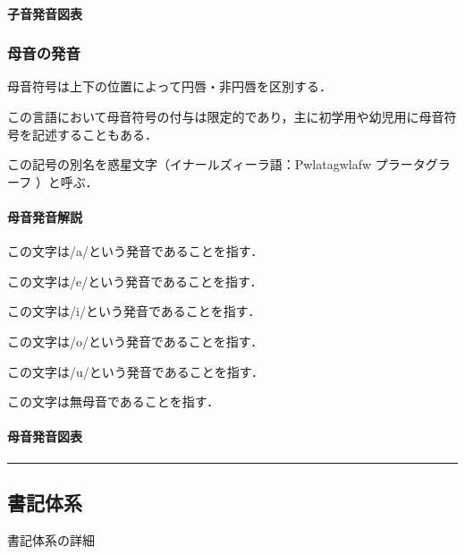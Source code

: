 \documentclass[
  japanese,
]{article}
\providecommand{\tightlist}{%
  \setlength{\itemsep}{0pt}\setlength{\parskip}{0pt}}
\begin{document}
\paragraph{子音発音図表}\label{subsection2.1.2}

\subsubsection{母音の発音}\label{section2.2}

\protect{}\label{vowel-symbol}{母音符号}は上下の位置によって円唇・非円唇を区別する．

この言語において母音符号の付与は限定的であり，主に初学用や幼児用に母音符号を記述することもある．

この記号の別名を惑星文字（イナールズィーラ語：{Pwlatagwlafw}
プラータグラーフ ）と呼ぶ．

\paragraph{母音発音解説}\label{subsection2.2.1}

\begin{description}
\tightlist
\item[{◌a}]
この文字は{/a/}という発音であることを指す．
\item[{◌e}]
この文字は{/e/}という発音であることを指す．
\item[{◌i}]
この文字は{/i/}という発音であることを指す．
\item[{◌o}]
この文字は{/o/}という発音であることを指す．
\item[{◌u}]
この文字は{/u/}という発音であることを指す．
\item[{◌w}]
この文字は無母音であることを指す．
\end{description}

\paragraph{母音発音図表}\label{subsection2.2.2}

\begin{center}\rule{0.5\linewidth}{0.5pt}\end{center}

\subsection{書記体系}\label{chapter3}

書記体系の詳細
\end{document}
